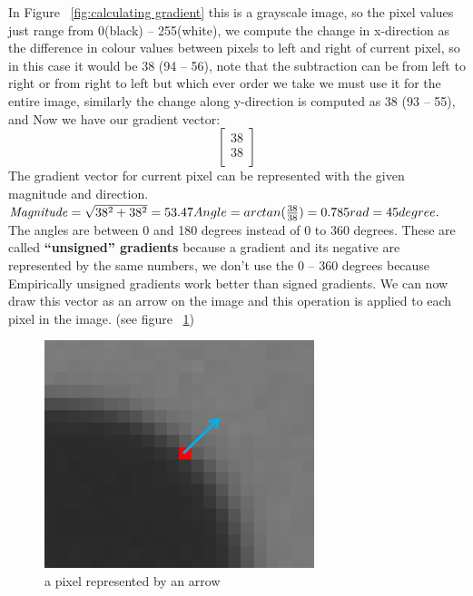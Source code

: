 In Figure ~\ref{fig:calculating gradient} this is a grayscale image, so the pixel values just range from 0(black) – 255(white), we compute the change in x-direction as the difference in colour values between pixels to left and right of current pixel, so in this case it would be 38 (94 – 56), note that the subtraction can be from left to right or from right to left but which ever order we take we must use it for the entire image, similarly the change along y-direction is computed as 38 (93 – 55), and Now we have our gradient vector:
\[ \begin{bmatrix}
38\\
38\\
\end{bmatrix} \]
The gradient vector for current pixel can be represented with the given magnitude and direction.
\newline \newline
\begin{math}
\mathit{Magnitude} = 
\sqrt{38^2 +  38^2} = 53.47 \newline Angle = arctan(\frac{38}{38}) = 0.785 rad = 45 degree.
\end{math}
\newline \newline
The angles are between 0 and 180 degrees instead of 0 to 360 degrees. These are called \textbf{“unsigned” gradients} because a gradient and its negative are represented by the same numbers, we don’t use the 0 – 360 degrees because Empirically unsigned gradients work better than signed gradients.
\newline
We can now draw this vector as an arrow on the image and this operation is applied to each pixel in the image. (see figure ~\ref{fig:pixel representation})

\begin{figure}
	\centering
	\includegraphics[width=0.70\textwidth]{gray_scale.png}
	\caption{a pixel represented by an arrow}
	\label{fig:pixel representation}
\end{figure}
